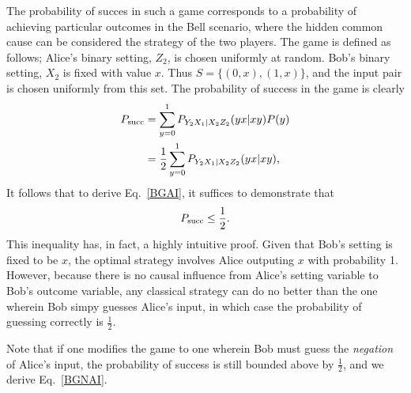 \documentclass[aps,english,superscriptaddress,onecolumn,twoside,longbibliography,pra,floatfix,fleqn,notitlepage,nofootinbib]{revtex4-1}
\theoremstyle{definition}
\begin{document}
The probability of succes in such a game corresponds to a probability of achieving particular outcomes in the Bell scenario, where the hidden common cause can be considered the strategy of the two players.  
The game is defined as follows; Alice's binary setting, $Z_2$, is chosen uniformly at random.  Bob's binary setting, $X_2$ is fixed with value $x$. Thus $S= \{ (0,x),(1,x)\}$, and the input pair is chosen uniformly from this set.  The probability of success in the game is clearly 
\begin{align}
P_{\rm succ} &= \sum_{y=0}^{1}P_{Y_2 X_1 |X_2 Z_2} (yx|xy) P(y)\nonumber\\
&=\frac{1}{2} \sum_{y=0}^{1} P_{Y_2 X_1 |X_2 Z_2} (yx|xy),
\end{align}
It follows that to derive Eq.~\eqref{BGAI}, it suffices to demonstrate that 
\begin{align}
P_{\rm succ} \le \frac{1}{2}.
\end{align}
This inequality has, in fact, a highly intuitive proof.  Given that Bob's setting is fixed to be $x$, the optimal strategy involves Alice outputing $x$ with probability 1.   However, because there is no causal influence from Alice's setting variable to Bob's outcome variable, any classical strategy can do no better than the one wherein Bob simpy guesses Alice's input, in which case the probability of guessing correctly is $\frac{1}{2}$.


Note that if one modifies the game to one wherein Bob must guess the {\em negation} of Alice's input, the probability of success is still bounded above by $\frac{1}{2}$, and we derive Eq.~\eqref{BGNAI}. 
\end{document}
